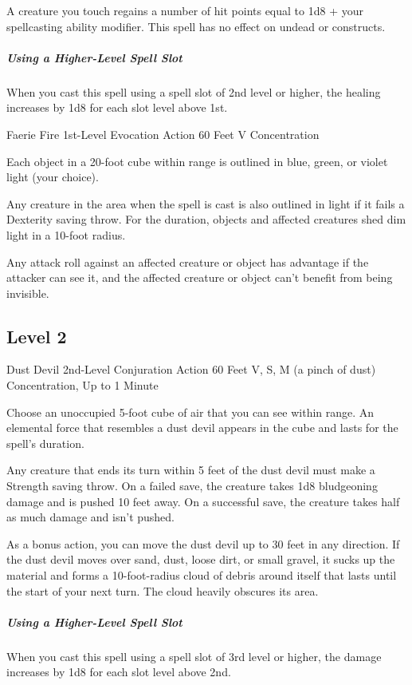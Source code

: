 \documentclass[letterpaper,openany,oneside,twocolumn]{book}
\begin{document}
A creature you touch regains a number of hit points equal to 1d8 + your spellcasting ability modifier. This spell has no effect on undead or constructs.

\subparagraph*{Using a Higher-Level Spell Slot} When you cast this spell using a spell slot of 2nd level or higher, the healing increases by 1d8 for each slot level above 1st.

\DndSpellHeader
  {Faerie Fire}
  {1st-Level Evocation}
  {Action}
  {60 Feet}
  {V}
  {Concentration}

Each object in a 20-foot cube within range is outlined in blue, green, or violet light (your choice).

Any creature in the area when the spell is cast is also outlined in light if it fails a Dexterity saving throw. For the duration, objects and affected creatures shed dim light in a 10-foot radius.

Any attack roll against an affected creature or object has advantage if the attacker can see it, and the affected creature or object can't benefit from being invisible.

\subsection*{Level 2}

\DndSpellHeader
  {Dust Devil}
  {2nd-Level Conjuration}
  {Action}
  {60 Feet}
  {V, S, M (a pinch of dust)}
  {Concentration, Up to 1 Minute}

Choose an unoccupied 5-foot cube of air that you can see within range. An elemental force that resembles a dust devil appears in the cube and lasts for the spell's duration.

Any creature that ends its turn within 5 feet of the dust devil must make a Strength saving throw. On a failed save, the creature takes 1d8 bludgeoning damage and is pushed 10 feet away. On a successful save, the creature takes half as much damage and isn't pushed.

As a bonus action, you can move the dust devil up to 30 feet in any direction. If the dust devil moves over sand, dust, loose dirt, or small gravel, it sucks up the material and forms a 10-foot-radius cloud of debris around itself that lasts until the start of your next turn. The cloud heavily obscures its area.

\subparagraph*{Using a Higher-Level Spell Slot} When you cast this spell using a spell slot of 3rd level or higher, the damage increases by 1d8 for each slot level above 2nd.
\end{document}

